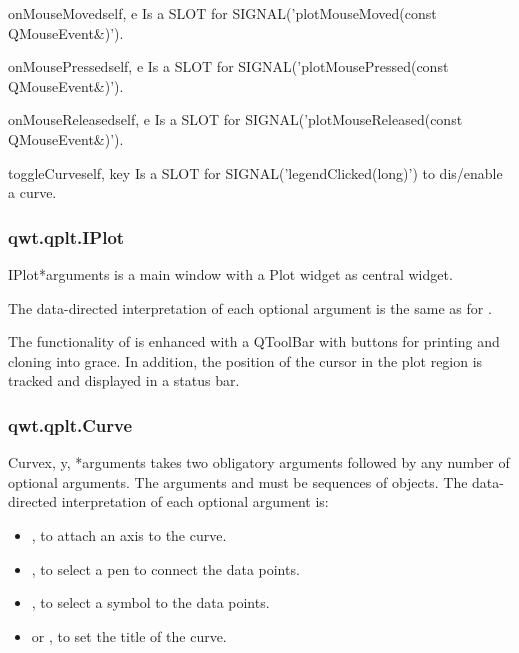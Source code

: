 \documentclass{manual}
\begin{document}
\begin{methoddesc}[Plot]{onMouseMoved}{self, e}
Is a SLOT for SIGNAL('plotMouseMoved(const QMouseEvent\&)').
\end{methoddesc}

\begin{methoddesc}[Plot]{onMousePressed}{self, e}
Is a SLOT for SIGNAL('plotMousePressed(const QMouseEvent\&)'). 
\end{methoddesc}

\begin{methoddesc}[Plot]{onMouseReleased}{self, e}
Is a SLOT for SIGNAL('plotMouseReleased(const QMouseEvent\&)').
\end{methoddesc}

\begin{methoddesc}[Plot]{toggleCurve}{self, key}
Is a SLOT for SIGNAL('legendClicked(long)') to dis/enable a curve.
\end{methoddesc}

\subsubsection{qwt.qplt.IPlot \label{intro-qplt-iplot}}

\begin{classdesc}{IPlot}{*arguments}
   is a main window with a Plot widget as central widget.

  The data-directed interpretation of each optional argument is the
  same as for .

  The functionality of  is enhanced with a QToolBar with
  buttons for printing and cloning into grace.
  In addition, the position of the cursor in the plot region is tracked
  and displayed in a status bar. 
\end{classdesc}

\subsubsection{qwt.qplt.Curve \label{intro-qplt-curve}}

\begin{classdesc}{Curve}{x, y, *arguments}
   takes two obligatory arguments followed by any number of
  optional arguments. The arguments  and  must be sequences
  of  objects.
  The data-directed interpretation of each optional argument is:
  \begin{itemize}
  \item
    , to attach an axis to the curve.
  \item
    , to select a pen to connect the data points.
  \item
    , to select a symbol to the data points.
  \item
     or ,  to set the title of the curve.
  \end{itemize}
\end{classdesc}
\end{document}
